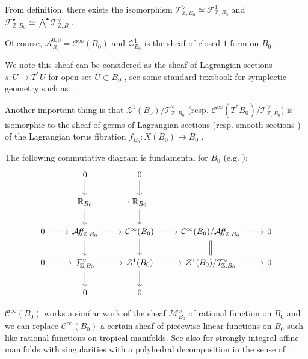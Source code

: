 \documentclass[a4paper,dvipdfmx,reqno,12pt]{amsart}
\theoremstyle{definition}
\newcommand{\Z}{\mathbb{Z}}%
\newcommand{\mb}[1]{\mathbb{#1}}%
\newcommand{\mcal}[1]{\mathcal{#1}}%
\newcommand{\TBZ}{\mcal{T}_{\Z,B_0}}
\newcommand{\AffS}{{\mathop{\mcal{A}\!f\!\!f\!}\nolimits}}
\numberwithin{equation}{section}
\begin{document}
From definition, there exists the isomorphism $\TBZ^{\vee}\simeq \mcal{F}_{\Z,B_0}^{1}$ and $\mcal{F}_{\Z,B_0}^{\bullet}\simeq \bigwedge^{\bullet}\TBZ^{\vee}$.


Of course, $\mcal{A}_{B_0}^{0,0}=\mcal{C}^{\infty}(B_0)$ and $\mcal{Z}^{1}_{B_0}$ is the sheaf of closed $1$-form on $B_0$.

We note this sheaf can be considered as the sheaf of Lagrangian sections $s:U \to T^{*}U$ for open set $U \subset B_0$ , see some standard textbook for symplectic geometry such as \cite[3.2]{MR1853077}.

Another important thing is that $\mcal{Z}^{1}(B_0)/\mcal{T}_{\Z,B_0}^{\vee}$ (resp. $\mcal{C}^{\infty}(T^{*}B_0)/\mcal{T}_{\Z,B_0}^{\vee}$) is isomorphic to the sheaf of germs of Lagrangian sections (resp. smooth sections ) of the Lagrangian torus fibration $\check{f}_{B_0} :\check{X}(B_0)\to B_0$ \cite[(2.7), (2.11)]{duistermaatGlobalActionangleCoordinates1980a}.



The following commutative diagram is fundamental for $B_0$ (e.g. \cite[p.468]{aspinwallDirichletBranesMirror2009});
\begin{equation} \label{eq:affinecartier}
  \begin{tikzcd}
    & 0 \arrow[d]    & 0 \arrow[d]           &                      &   \\
    & \mb{R}_{B_0} \arrow[r,equal] \arrow[d]                & \mb{R}_{B_0} \arrow[d]           &                      &   \\
    0 \arrow[r] & \AffS_{\Z,B_0} \arrow[r] \arrow[d]         & \mcal{C}^{\infty}(B_0) \arrow[r] \arrow[d] & \mcal{C}^{\infty}(B_0)/\AffS_{\Z,B_0}  \arrow[r] \arrow[d,equal] & 0 \\
    0 \arrow[r] & \mcal{T}_{\Z,B_0}^{\vee} \arrow[r] \arrow[d] & \mcal{Z}^{1}(B_0) \arrow[r] \arrow[d]  & \mcal{Z}^{1}(B_0)/\mcal{T}_{\Z,B_0}^{\vee} \arrow[r]   & 0 \\
    & 0 & 0 &  &
  \end{tikzcd}
\end{equation}



$\mcal{C}^{\infty}(B_0)$ works a similar work of the sheaf $\mcal{M}_{B_0}^{\times}$ of rational function on $B_0$ and we can replace $\mcal{C}^{\infty}(B_0)$ a certain sheaf of piecewise linear functions on $B_0$ such like rational functions on tropical manifolds. See also \cite[Definition 1.45]{grossMirrorSymmetryLogarithmic2006a} for strongly integral affine manifolds with singularities with a polyhedral decomposition in the sense of \cite[Definition 1.22]{grossMirrorSymmetryLogarithmic2006a}.
\end{document}
